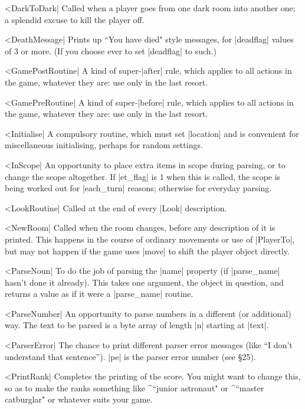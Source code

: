 {{{^^|DarkToDark|
Called when a player goes from one dark room into another one; a splendid
excuse to kill the player off.

^^|DeathMessage|
Prints up ``You have died" style messages, for |deadflag| values of 3 or
more.  (If you choose ever to set |deadflag| to such.)

^^|GamePostRoutine|
A kind of super-|after| rule, which applies to all actions in the game,
whatever they are: use only in the last resort.

^^|GamePreRoutine|
A kind of super-|before| rule, which applies to all actions in the game,
whatever they are: use only in the last resort.

^^|Initialise|
A compulsory routine, which must set |location| and is convenient for
miscellaneous initialising, perhaps for random settings.

^^|InScope|
An opportunity to place extra items in scope during parsing, or to change
the scope altogether.  If |et_flag| is 1 when this is called, the scope is
being worked out for |each_turn| reasons; otherwise for everyday parsing.

^^|LookRoutine|
Called at the end of every |Look| description.

^^|NewRoom|
Called when the room changes, before any description of it is printed.  This
happens in the course of ordinary movements or use of |PlayerTo|, but may
not happen if the game uses |move| to shift the player object directly.

^^|ParseNoun|
To do the job of parsing the |name| property (if |parse_name| hasn't done
it already).  This takes one argument, the object in question, and returns
a value as if it were a |parse_name| routine.

^^|ParseNumber|
An opportunity to parse numbers in a different (or additional) way.  The
text to be parsed is a byte array of length |n| starting at |text|.

^^|ParserError|
The chance to print different parser error messages (like ``I don't
understand that sentence'').  |pe| is the parser error number (see \S 25).

^^|PrintRank|
Completes the printing of the score.  You might want to change this, so as
to make the ranks something like ^{``junior astronaut"} or ^{``master
catburglar"} or whatever suits your game.

}}}
